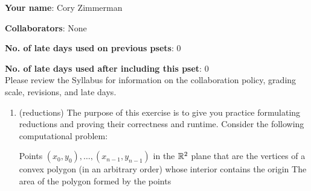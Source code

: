 \documentclass[11pt]{article}
\begin{document}

\textbf{Your name}: Cory Zimmerman

\textbf{Collaborators}: None

\textbf{No. of late days used on previous psets}: 0

\textbf{No. of late days used after including this pset}: 0
\\

Please review the Syllabus for information on the collaboration 
policy, grading scale, revisions, and late days.


\begin{enumerate}
     \item  (reductions) The purpose of this exercise is to give you practice formulating reductions and proving their correctness and runtime.
    Consider the following computational problem:

    {Points $(x_0,y_0),\ldots,(x_{n-1},y_{n-1})$ in the $\mathbb{R}^2$ plane that are the vertices of a convex polygon (in an arbitrary order) whose interior contains the origin}
    {The area of the polygon formed by the points}



\end{enumerate}
\end{document}

